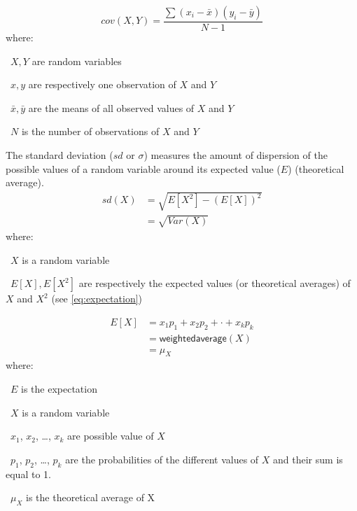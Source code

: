 \begin{equation}
    \tag{Covariance}\label{eq:covariance}
        cov(X,Y) =  \frac{\sum{(x_{i}-\bar{x})(y_{i}-\bar{y})}}{N-1}
\end{equation}
where:
\quad\begin{eqlist}
       \item[\textbullet\ $X,Y$] are random variables
       \item[\textbullet\ $x,y$] are respectively one observation of $X$ and $Y$
       \item[\textbullet\ $\bar{x},\bar{y}$] are the means
           of all observed values of $X$ and $Y$
       \item[\textbullet\ $N$] is the number of observations of $X$ and $Y$
\end{eqlist}

The standard deviation ($sd$ or $\sigma$) measures the amount of dispersion of the
possible values of a random variable around its expected value ($E$) (theoretical average).
\begin{equation}\label{eq:sd}
    \tag{Standard deviation}
    \begin{split}
        sd(X) & = \sqrt{E[X^2]-(E[X])^2} \\
              & = \sqrt{Var(X)}
    \end{split}
\end{equation}
where:
\quad\begin{eqlist}
    \item[\textbullet\ $X$] is a random variable
    \item[\textbullet\ ${E[X],E[X^2]}$] are respectively the expected values
        (or theoretical averages) of $X$ and $X^2$ (see \cref{eq:expectation})
\end{eqlist}

\begin{equation}\label{eq:expectation}
    \tag{Expectation}
    \begin{split}
        E[X] & = x_1p_1 + x_2p_2+ \cdot +x_kp_k \\
             & = \mathsf{weighted average}(X) \\
             & = \mu_X
    \end{split}
\end{equation}
where:%
\quad\begin{eqlist}
    \item[\textbullet\ $E$] is the expectation
    \item[\textbullet\ $X$] is a random variable
    \item[\textbullet\ $x_1$, $x_2$, \ldots, $x_k$] are possible value of $X$
    \item[\textbullet\ $p_1$, $p_2$, \ldots, $p_k$] are the probabilities of
        the different values of $X$ and their sum is equal to 1.
    \item[\textbullet\ $\mu_X$] is the theoretical average of X
\end{eqlist}

